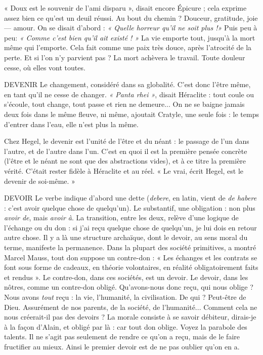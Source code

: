 « Doux est le souvenir de l’ami disparu », disait encore Épicure ; cela
exprime assez bien ce qu’est un deuil réussi. Au bout du chemin ? Douceur,
gratitude, joie — amour. On se disait d’abord : {\it « Quelle horreur qu'il ne soit
plus !»} Puis peu à peu: {\it « Comme c'est bien qu'il ait existé ! »} La vie emporte
tout, jusqu’à la mort même qui l’emporte. Cela fait comme une paix très
douce, après l’atrocité de la perte. Et si l’on n’y parvient pas ? La mort achèvera
le travail. Toute douleur cesse, où elles vont toutes.

DEVENIR Le changement, considéré dans sa globalité. C’est donc l'être même,
en tant qu'il ne cesse de changer. {\it « Panta rhei »}, disait Héraclite :
tout coule ou s'écoule, tout change, tout passe et rien ne demeure... On ne se
baigne jamais deux fois dans le même fleuve, ni même, ajoutait Cratyle, une seule
fois : le temps d’entrer dans l’eau, elle n’est plus la même.

Chez Hegel, le devenir est l’unité de l’être et du néant : le passage de l’un
dans l’autre, et de l’autre dans l’un. C’est en quoi il est la première pensée
concrète (l'être et le néant ne sont que des abstractions vides), et à ce titre la
première vérité. C'était rester fidèle à Héraclite et au réel. « Le vrai, écrit Hegel,
est le devenir de soi-même. »

DEVOIR Le verbe indique d’abord une dette ({\it debere}, en latin, vient de {\it de
habere} : c’est avoir quelque chose de quelqu’un). Le substantif, une
obligation : non plus {\it avoir de}, mais {\it avoir à}. La transition, entre les deux, relève
d’une logique de l'échange ou du don : si j’ai reçu quelque chose de quelqu'un,
je lui dois en retour autre chose. Il y a là une structure archaïque, dont le
devoir, au sens moral du terme, manifeste la permanence. Dans la plupart des
société primitives, a montré Marcel Mauss, tout don suppose un contre-don :
« Les échanges et les contrats se font sous forme de cadeaux, en théorie volontaires,
en réalité obligatoirement faits et rendus ». Le contre-don, dans ces
sociétés, est un devoir. Le devoir, dans les nôtres, comme un contre-don obligé.
Qu’avons-nous donc reçu, qui nous oblige ? Nous avons {\it tout} reçu : la vie,
l'humanité, la civilisation. De qui ? Peut-être de Dieu. Assurément de nos
parents, de la société, de l'humanité... Comment cela ne nous créerait-il pas
des devoirs ? La morale consiste à se savoir débiteur, dirais-je à la façon d’Alain,
et obligé par là : car tout don oblige. Voyez la parabole des talents. Il ne s’agit
pas seulement de rendre ce qu’on a reçu, mais de le faire fructifier au mieux.
Ainsi le premier devoir est de ne pas oublier qu’on en a.

